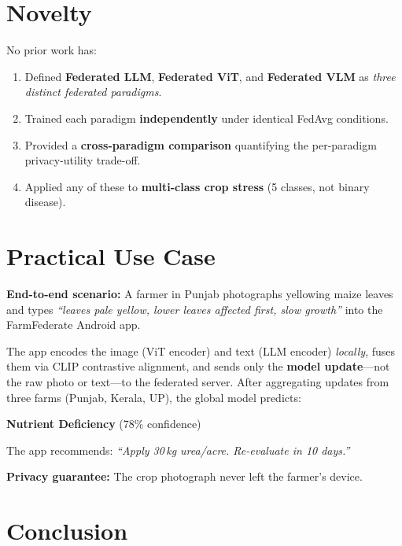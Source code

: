 \documentclass[11pt,a4paper]{article}
\newcommand{\paradigm}[2]{\textcolor{#1}{\textbf{#2}}}
\newcommand{\fedllm}{\paradigm{llmblue}{Federated LLM}}
\newcommand{\fedvit}{\paradigm{vitgreen}{Federated ViT}}
\newcommand{\fedvlm}{\paradigm{vlmred}{Federated VLM}}
\begin{document}
\section{Novelty}

No prior work has:
\begin{enumerate}[leftmargin=1.5em, itemsep=2pt]
  \item Defined \fedllm{}, \fedvit{}, and \fedvlm{} as \emph{three distinct federated paradigms}.
  \item Trained each paradigm \textbf{independently} under identical FedAvg conditions.
  \item Provided a \textbf{cross-paradigm comparison} quantifying the per-paradigm
        privacy-utility trade-off.
  \item Applied any of these to \textbf{multi-class crop stress} (5 classes, not binary disease).
\end{enumerate}

\section{Practical Use Case}

\begin{examplebox}
\textbf{End-to-end scenario:} A farmer in Punjab photographs yellowing maize leaves and
types \textit{``leaves pale yellow, lower leaves affected first, slow growth''} into the
FarmFederate Android app.

\medskip
The app encodes the image (ViT encoder) and text (LLM encoder) \emph{locally}, fuses them
via CLIP contrastive alignment, and sends only the \textbf{model update}---not the raw
photo or text---to the federated server.
After aggregating updates from three farms (Punjab, Kerala, UP), the global model predicts:

\medskip
\centerline{\Large\textcolor{vitgreen}{\bfseries Nutrient Deficiency} \quad (78\% confidence)}

\medskip
The app recommends: \textit{``Apply 30\,kg urea/acre. Re-evaluate in 10 days.''}

\medskip
\textbf{Privacy guarantee:} The crop photograph never left the farmer's device.
\end{examplebox}

\section{Conclusion}
\end{document}
